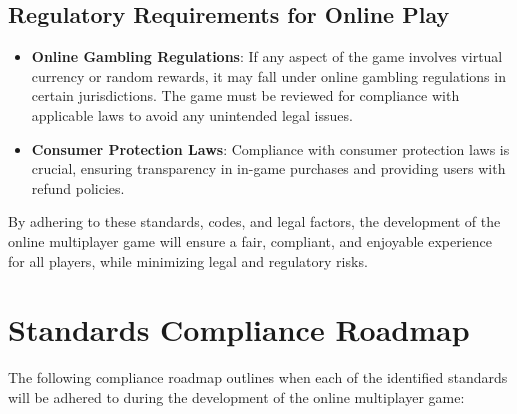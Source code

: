 \subsection{Regulatory Requirements for Online Play}
\begin{itemize}
    \item \textbf{Online Gambling Regulations}: If any aspect of the game involves virtual currency or random rewards, it may fall under online gambling regulations in certain jurisdictions. The game must be reviewed for compliance with applicable laws to avoid any unintended legal issues.
    \item \textbf{Consumer Protection Laws}: Compliance with consumer protection laws is crucial, ensuring transparency in in-game purchases and providing users with refund policies.
\end{itemize}

By adhering to these standards, codes, and legal factors, the development of the online multiplayer game will ensure a fair, compliant, and enjoyable experience for all players, while minimizing legal and regulatory risks.

\newpage
\section{Standards Compliance Roadmap}

The following compliance roadmap outlines when each of the identified standards will be adhered to during the development of the online multiplayer game:

